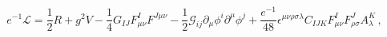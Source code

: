 \begin{equation}
e^{-1}\mathcal{L}=\frac{1}{2}R+g^{2}V-\frac{1}{4}G_{IJ}F_{\mu \nu
}^{I}F^{J\mu \nu }-\frac{1}{2}\mathcal{G}_{ij}\partial _{\mu }\phi
^{i}\partial ^{\mu }\phi ^{j}+\frac{e^{-1}}{48}\epsilon ^{\mu \nu \rho
\sigma \lambda }C_{IJK}F_{\mu \nu }^{I}F_{\rho \sigma }^{J}A_{\lambda
}^{K}\,,  \label{action}
\end{equation}

